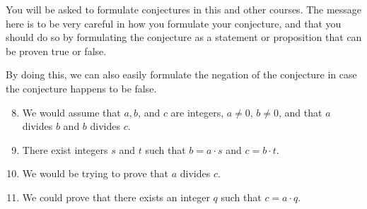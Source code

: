 \documentclass[11pt]{article}
\begin{document}
You will be asked to formulate conjectures in this and other courses.  The message here is to be very careful in how you formulate your conjecture, and that you should do so by formulating the conjecture as a statement or proposition that can be proven true or false.

By doing this, we can also easily formulate the negation of the conjecture in case the conjecture happens to be false.


\begin{enumerate} \setcounter{enumi}{7} %
  \item We would assume that $a, b$, and $c$ are integers, $a \ne 0$, $b \ne 0$, and that $a$ divides $b$ and 
        $b$ divides $c$.
  \item There exist integers $s$ and $t$ such that $b = a \cdot s$ and $c = b \cdot t$.
  \item We would be trying to prove that $a$ divides $c$.
  \item We could prove that there exists an integer $q$ such that  $c = a \cdot q$.
\end{enumerate}

\hbreak
\newpage
\end{document}
